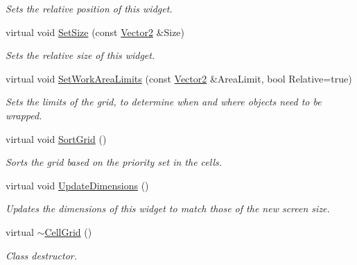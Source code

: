 \begin{DoxyCompactItemize}
\begin{DoxyCompactList}\small\item\em Sets the relative position of this widget. \item\end{DoxyCompactList}\item 
virtual void \hyperlink{classMezzanine_1_1UI_1_1CellGrid_afcff9353be7ea7408aa2ea621efdaf99}{SetSize} (const \hyperlink{classMezzanine_1_1Vector2}{Vector2} \&Size)
\begin{DoxyCompactList}\small\item\em Sets the relative size of this widget. \item\end{DoxyCompactList}\item 
virtual void \hyperlink{classMezzanine_1_1UI_1_1CellGrid_af3de91eb3de30b73cf2b8c6f0c7f266f}{SetWorkAreaLimits} (const \hyperlink{classMezzanine_1_1Vector2}{Vector2} \&AreaLimit, bool Relative=true)
\begin{DoxyCompactList}\small\item\em Sets the limits of the grid, to determine when and where objects need to be wrapped. \item\end{DoxyCompactList}\item 
\hypertarget{classMezzanine_1_1UI_1_1CellGrid_a276e97c0b2c8b8e1ed6a979708b445ef}{
virtual void \hyperlink{classMezzanine_1_1UI_1_1CellGrid_a276e97c0b2c8b8e1ed6a979708b445ef}{SortGrid} ()}
\label{classMezzanine_1_1UI_1_1CellGrid_a276e97c0b2c8b8e1ed6a979708b445ef}

\begin{DoxyCompactList}\small\item\em Sorts the grid based on the priority set in the cells. \item\end{DoxyCompactList}\item 
virtual void \hyperlink{classMezzanine_1_1UI_1_1CellGrid_a11cda11f70cd331c9bd39daf0b0f24aa}{UpdateDimensions} ()
\begin{DoxyCompactList}\small\item\em Updates the dimensions of this widget to match those of the new screen size. \item\end{DoxyCompactList}\item 
\hypertarget{classMezzanine_1_1UI_1_1CellGrid_a4ffeba2ec2e555c80f7224efcf886e42}{
virtual \hyperlink{classMezzanine_1_1UI_1_1CellGrid_a4ffeba2ec2e555c80f7224efcf886e42}{$\sim$CellGrid} ()}
\label{classMezzanine_1_1UI_1_1CellGrid_a4ffeba2ec2e555c80f7224efcf886e42}

\begin{DoxyCompactList}\small\item\em Class destructor. \item\end{DoxyCompactList}\end{DoxyCompactItemize}
